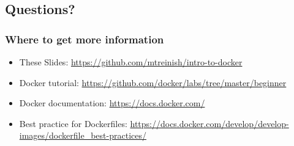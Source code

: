 \documentclass[aspectratio=169,11pt,hyperref={colorlinks=true}]{beamer}
\begin{document}
\subsection{Questions?}
\begin{frame}
\frametitle{Where to get more information}
    \begin{itemize}
        \item These Slides: \href{https://github.com/mtreinish/intro-to-docker}{https://github.com/mtreinish/intro-to-docker}
        \item Docker tutorial: \href{https://github.com/docker/labs/tree/master/beginner}{https://github.com/docker/labs/tree/master/beginner}
        \item Docker documentation: \href{https://docs.docker.com/}{https://docs.docker.com/}
        \item Best practice for Dockerfiles: \href{https://docs.docker.com/develop/develop-images/dockerfile\_best-practices/}{https://docs.docker.com/develop/develop-images/dockerfile\_best-practices/}
    \end{itemize}
\end{frame}
\end{document}
